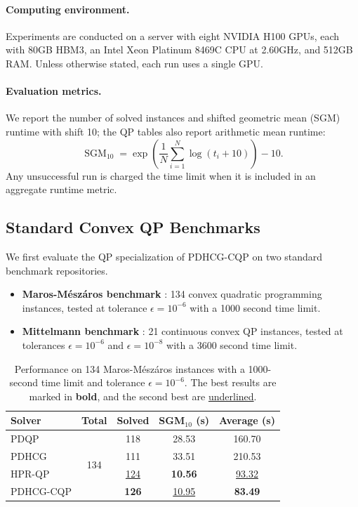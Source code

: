 \documentclass[letterpaper]{article} %
\newcommand{\name}{PDHCG-CQP\xspace}
\theoremstyle{definition}
\theoremstyle{remark}
\newcommand{\papertablesetup}{\small\setstretch{1.0}\renewcommand{\arraystretch}{1.2}}
\begin{document}
\paragraph{Computing environment.}
Experiments are conducted on a server with eight NVIDIA H100 GPUs, each with
80GB HBM3, an Intel Xeon Platinum 8469C CPU at 2.60GHz, and 512GB RAM. Unless
otherwise stated, each run uses a single GPU.

\paragraph{Evaluation metrics.}
We report the number of solved instances and shifted geometric mean (SGM)
runtime
with shift 10; the QP tables also report arithmetic mean runtime:
\begin{equation}
    \operatorname{SGM}_{10}
    =
    \exp\left(\frac1N\sum_{i=1}^N \log(t_i+10)\right)-10 .
\end{equation}
Any unsuccessful run is charged the time limit when it is included in an
aggregate runtime metric.

\subsection{Standard Convex QP Benchmarks}

We first evaluate the QP specialization of \name on two standard benchmark repositories.
\begin{itemize}
    \item \textbf{Maros-M{\'e}sz{\'a}ros benchmark} \cite{maros1999repository}: 134 convex quadratic programming instances, tested at tolerance $\epsilon=10^{-6}$ with a 1000 second time limit.
    \item \textbf{Mittelmann benchmark} \cite{mittelmann2021decision}: 21 continuous convex QP instances, tested at tolerances $\epsilon=10^{-6}$ and $\epsilon=10^{-8}$ with a 3600 second time limit.
\end{itemize}

\begin{table}[H]
  \centering
  \papertablesetup
  \caption{Performance on 134 Maros-M{\'e}sz{\'a}ros instances with a
  1000-second time limit and tolerance $\epsilon=10^{-6}$. The best results
  are marked in \textbf{bold}, and the second best are
  \underline{underlined}.}
  \label{tab:comparison_134}
  \medskip
  \begin{tabular}{lcccc}
    \toprule
    \textbf{Solver} & \textbf{Total} & \textbf{Solved} & \textbf{SGM$_{10}$ (s)} & \textbf{Average (s)} \\
    \midrule
    PDQP & \multirow{4}{*}{134} & 118 & 28.53 & 160.70 \\
    PDHCG & & 111 & 33.51 & 210.53 \\
    HPR-QP & & \underline{124} & \textbf{10.56} & \underline{93.32} \\
    \name & & \textbf{126} & \underline{10.95} & \textbf{83.49} \\
    \bottomrule
  \end{tabular}
\end{table}
\end{document}
